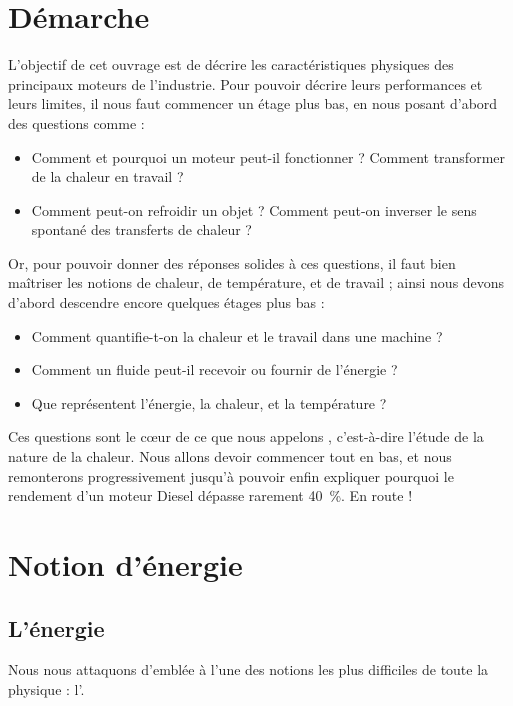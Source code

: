 \section{Démarche}

	L’objectif de cet ouvrage est de décrire les caractéristiques physiques des principaux moteurs de l’industrie. Pour pouvoir décrire leurs performances et leurs limites, il nous faut commencer un étage plus bas, en nous posant d’abord des questions comme :
	
		\begin{itemize}
			\item Comment et pourquoi un moteur peut-il fonctionner ? Comment transformer de la chaleur en travail ?
			\item Comment peut-on refroidir un objet ? Comment peut-on inverser le sens spontané des transferts de chaleur ?
		\end{itemize}

	Or, pour pouvoir donner des réponses solides à ces questions, il faut bien maîtriser les notions de chaleur, de température, et de travail ; ainsi nous devons d’abord descendre encore quelques étages plus bas :
	
		\begin{itemize}
			\item Comment quantifie-t-on la chaleur et le travail dans une machine ?
			\item Comment un fluide peut-il recevoir ou fournir de l’énergie ?
			\item Que représentent l’énergie, la chaleur, et la température ?
		\end{itemize}

	Ces questions sont le cœur de ce que nous appelons , c’est-à-dire l’étude de la nature de la chaleur. Nous allons devoir commencer tout en bas, et nous remonterons progressivement jusqu’à pouvoir enfin expliquer pourquoi le rendement d’un moteur Diesel dépasse rarement \SI{40}{\percent}. En route !
	
\section{Notion d’énergie}

	\subsection{L’énergie}
	
		Nous nous attaquons d’emblée à l’une des notions les plus difficiles de toute la physique : l’. 
		

